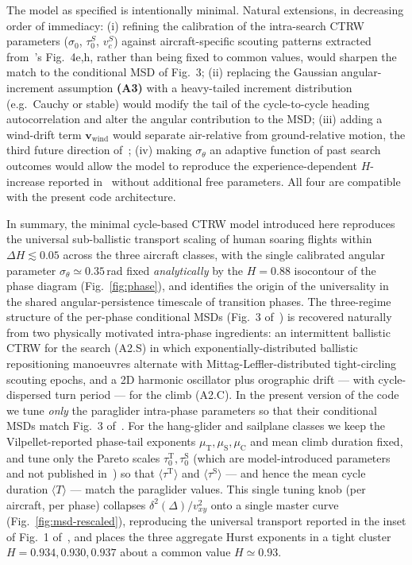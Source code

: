 \documentclass[11pt,a4paper]{article}
\begin{document}
The model as specified is intentionally minimal. Natural
extensions, in decreasing order of immediacy:
(i) refining the calibration of the intra-search CTRW
parameters ($\sigma_0$, $\tau_0^S$, $v_c^S$) against
aircraft-specific scouting patterns extracted
from~\cite{vilpellet2026}'s Fig.~4e,h, rather than being fixed
to common values, would sharpen the match to the conditional
MSD of Fig.~3;
(ii) replacing the Gaussian angular-increment assumption
\textbf{(A3)} with a heavy-tailed increment distribution (e.g.\
Cauchy or stable) would modify the tail of the cycle-to-cycle
heading autocorrelation and alter the angular contribution to
the MSD;
(iii) adding a wind-drift term $\mathbf{v}_{\mathrm{wind}}$ would
separate air-relative from ground-relative motion, the third
future direction of~\cite{vilpellet2026};
(iv) making $\sigma_\theta$ an adaptive function of past search
outcomes would allow the model to reproduce the experience-dependent
$H$-increase reported in~\cite{vilpellet2026} without additional
free parameters. All four are compatible with the present code
architecture.

In summary, the minimal cycle-based CTRW model introduced here
reproduces the universal sub-ballistic transport scaling of human
soaring flights within $\Delta H \lesssim 0.05$ across the three
aircraft classes, with the single calibrated angular parameter
$\sigma_\theta\simeq 0.35$\,rad fixed \emph{analytically} by the
$H=0.88$ isocontour of the phase diagram
(Fig.~\ref{fig:phase}), and identifies the origin of the
universality in the shared angular-persistence timescale of
transition phases. The three-regime structure of the per-phase
conditional MSDs (Fig.~3 of~\cite{vilpellet2026}) is recovered
naturally from two physically motivated intra-phase ingredients:
an intermittent ballistic CTRW for the search (A2.S) in which
exponentially-distributed ballistic repositioning manoeuvres
alternate with Mittag-Leffler-distributed tight-circling scouting
epochs, and a
2D harmonic oscillator plus orographic drift --- with
cycle-dispersed turn period --- for the climb (A2.C). In the
present version of the code we tune \emph{only} the paraglider
intra-phase parameters so that their conditional MSDs match Fig.~3
of~\cite{vilpellet2026}. For the hang-glider and sailplane classes
we keep the Vilpellet-reported phase-tail exponents
$\mu_{\mathrm{T}}, \mu_{\mathrm{S}}, \mu_{\mathrm{C}}$ and mean
climb duration fixed, and tune only the Pareto scales
$\tau_0^{\mathrm{T}}, \tau_0^{\mathrm{S}}$ (which are
model-introduced parameters and not published
in~\cite{vilpellet2026}) so that $\langle\tau^{\mathrm{T}}\rangle$
and $\langle\tau^{\mathrm{S}}\rangle$ --- and hence the mean
cycle duration $\langle T\rangle$ --- match the paraglider
values. This single tuning knob (per aircraft, per phase)
collapses $\delta^2(\Delta)/v_{xy}^2$ onto a single master
curve (Fig.~\ref{fig:msd-rescaled}), reproducing the universal
transport reported in the inset of Fig.~1
of~\cite{vilpellet2026}, and places the three aggregate Hurst
exponents in a tight cluster $H = 0.934, 0.930, 0.937$ about
a common value $H\simeq 0.93$.
\end{document}
